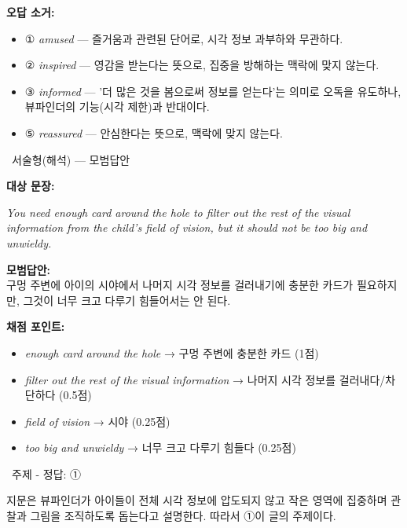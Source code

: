 \documentclass[11pt,a4paper]{article}
\newcommand{\qno}[1]{\par\vspace{10pt}\noindent{\sffamily\bfseries #1.}\ }
\newcommand{\instr}[1]{{\sffamily #1}\par\vspace{3pt}}
\begin{document}
\textbf{오답 소거:}
\begin{itemize}[leftmargin=2em,itemsep=1pt,topsep=2pt]
  \item ① \textit{amused} — 즐거움과 관련된 단어로, 시각 정보 과부하와 무관하다.
  \item ② \textit{inspired} — 영감을 받는다는 뜻으로, 집중을 방해하는 맥락에 맞지 않는다.
  \item ③ \textit{informed} — '더 많은 것을 봄으로써 정보를 얻는다'는 의미로 오독을 유도하나, 뷰파인더의 기능(시각 제한)과 반대이다.
  \item ⑤ \textit{reassured} — 안심한다는 뜻으로, 맥락에 맞지 않는다.
\end{itemize}

\qno{3}\instr{서술형(해석) — 모범답안}

\textbf{대상 문장:}
\begin{pbox}
\textit{You need enough card around the hole to filter out the rest of the visual information from the child's field of vision, but it should not be too big and unwieldy.}
\end{pbox}

\vspace{4pt}
\textbf{모범답안:}\\
구멍 주변에 아이의 시야에서 나머지 시각 정보를 걸러내기에 충분한 카드가 필요하지만, 그것이 너무 크고 다루기 힘들어서는 안 된다.

\vspace{6pt}
\textbf{채점 포인트:}
\begin{itemize}[leftmargin=2em,itemsep=1pt,topsep=2pt]
  \item \textit{enough card around the hole} → 구멍 주변에 충분한 카드 (1점)
  \item \textit{filter out the rest of the visual information} → 나머지 시각 정보를 걸러내다/차단하다 (0.5점)
  \item \textit{field of vision} → 시야 (0.25점)
  \item \textit{too big and unwieldy} → 너무 크고 다루기 힘들다 (0.25점)
\end{itemize}

\vspace{8pt}
\qno{4}\instr{주제 - 정답: ①}
\par 지문은 뷰파인더가 아이들이 전체 시각 정보에 압도되지 않고 작은 영역에 집중하며 관찰과 그림을 조직하도록 돕는다고 설명한다. 따라서 ①이 글의 주제이다.
\end{document}
